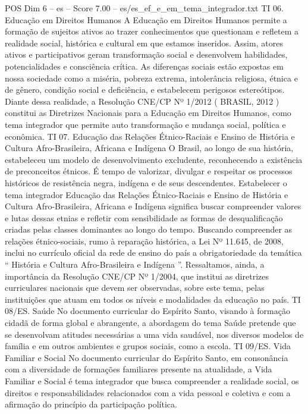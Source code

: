 \begin{textsample}{POS Dim 6 – es – Score 7.00 – es/es\_ef\_e\_em\_tema\_integrador.txt}
TI 06.
Educação em Direitos Humanos A Educação em Direitos Humanos permite a formação de sujeitos ativos ao trazer conhecimentos que questionam e refletem a realidade social, histórica e cultural em que estamos inseridos.
Assim, atores ativos e participativos geram transformação social e desenvolvem habilidades, potencialidades e consciência crítica.
As diferenças sociais estão expostas em nossa sociedade como a miséria, pobreza extrema, intolerância religiosa, étnica e de gênero, condição social e deficiência, e estabelecem perigosos estereótipos.
Diante dessa realidade, a Resolução CNE/CP Nº 1/2012 ( BRASIL, 2012 ) constitui as Diretrizes Nacionais para a Educação em Direitos Humanos, como tema integrador que permite auto transformação e mudança social, política e econômica.
TI 07.
Educação das Relações Étnico-Raciais e Ensino de História e Cultura Afro-Brasileira, Africana e Indígena O Brasil, ao longo de sua história, estabeleceu um modelo de desenvolvimento excludente, reconhecendo a existência de preconceitos étnicos.
É tempo de valorizar, divulgar e respeitar os processos históricos de resistência negra, indígena e de seus descendentes.
Estabelecer o tema integrador Educação das Relações Étnico-Raciais e Ensino de História e Cultura Afro-Brasileira, Africana e Indígena significa buscar compreender valores e lutas dessas etnias e refletir com sensibilidade as formas de desqualificação criadas pelas classes dominantes ao longo do tempo.
Buscando compreender as relações étnico-sociais, rumo à reparação histórica, a Lei Nº 11.645, de 2008, inclui no currículo oficial da rede de ensino do país a obrigatoriedade da temática “ História e Cultura Afro-Brasileira e Indígena ”.
Ressaltamos, ainda, a importância da Resolução CNE/CP Nº 1/2004, que institui as diretrizes curriculares nacionais que devem ser observadas, sobre este tema, pelas instituições que atuam em todos os níveis e modalidades da educação no país.
TI 08/ES.
Saúde No documento curricular do Espírito Santo, visando à formação cidadã de forma global e abrangente, a abordagem do tema Saúde pretende que se desenvolvam atitudes necessárias a uma vida saudável, nos diversos modelos de família e em outros ambientes e grupos sociais, como a escola.
TI 09/ES.
Vida Familiar e Social No documento curricular do Espírito Santo, em consonância com a diversidade de formações familiares presente na atualidade, a Vida Familiar e Social é tema integrador que busca compreender a realidade social, os direitos e responsabilidades relacionados com a vida pessoal e coletiva e com a afirmação do princípio da participação política.

\end{textsample}
